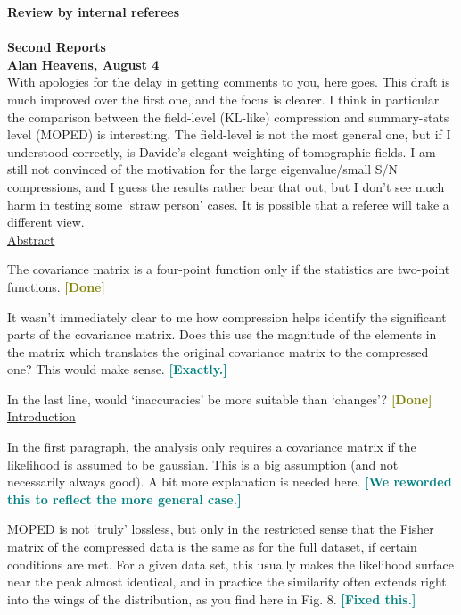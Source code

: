 \documentclass{article}
\newcommand\reply[1]{{\bf {\textcolor{teal}{[#1]}}}}
\newcommand\done{{\bf {\textcolor{olive}{[Done]}}}}
\begin{document}
    {\LARGE\textbf{Review by internal referees}}\\ \\

    {\Large\textbf{Second Reports}}\\
    
    \textbf{Alan Heavens, August 4}\\

    With apologies for the delay in getting comments to you, here goes.  This draft is much improved over the first one, and the focus is clearer.  I think in particular the comparison between the field-level (KL-like) compression and summary-stats level (MOPED) is interesting.  The field-level is not the most general one, but if I understood correctly, is Davide’s elegant weighting of tomographic fields.  I am still not convinced of the motivation for the large eigenvalue/small S/N compressions, and I guess the results rather bear that out, but I don’t see much harm in testing some ‘straw person’ cases.  It is possible that a referee will take a different view.\\
 
    \underline{Abstract}
    
    The covariance matrix is a four-point function only if the statistics are two-point functions. \done

    It wasn’t immediately clear to me how compression helps identify the significant parts of the covariance matrix.  Does this use the magnitude of the elements in the matrix which translates the original covariance matrix to the compressed one?  This would make sense. \reply{Exactly.}

    In the last line, would ‘inaccuracies’ be more suitable than ‘changes’? \done\\

    \underline{Introduction}
    
    In the first paragraph, the analysis only requires a covariance matrix if the likelihood is assumed to be gaussian.  This is a big assumption (and not necessarily always good).  A bit more explanation is needed here. \reply{We reworded this to reflect the more general case.}

    MOPED is not ‘truly’ lossless, but only in the restricted sense that the Fisher matrix of the compressed data is the same as for the full dataset, if certain conditions are met.  For a given data set, this usually makes the likelihood surface near the peak almost identical, and in practice the similarity often extends right into the wings of the distribution, as you find here in Fig. 8. \reply{Fixed this.}
\end{document}
